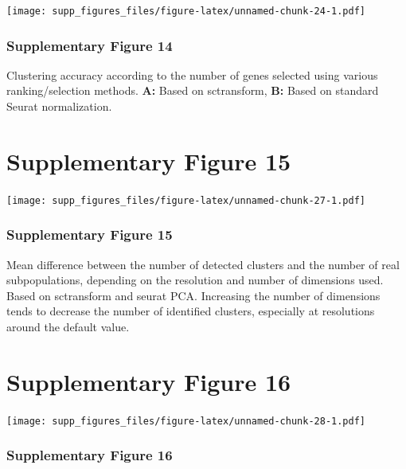 \documentclass[]{article}
\begin{document}
\texttt{[image: supp\_figures\_files/figure-latex/unnamed-chunk-24-1.pdf]}

\hypertarget{supplementary-figure-14-1}{%
\subsubsection{Supplementary Figure
14}\label{supplementary-figure-14-1}}

Clustering accuracy according to the number of genes selected using
various ranking/selection methods. \textbf{A:} Based on sctransform,
\textbf{B:} Based on standard Seurat normalization.

\newpage

\hypertarget{supplementary-figure-15}{%
\section{Supplementary Figure 15}\label{supplementary-figure-15}}

\texttt{[image: supp\_figures\_files/figure-latex/unnamed-chunk-27-1.pdf]}

\hypertarget{supplementary-figure-15-1}{%
\subsubsection{Supplementary Figure
15}\label{supplementary-figure-15-1}}

Mean difference between the number of detected clusters and the number
of real subpopulations, depending on the resolution and number of
dimensions used. Based on sctransform and seurat PCA. Increasing the
number of dimensions tends to decrease the number of identified
clusters, especially at resolutions around the default value.

\newpage

\hypertarget{supplementary-figure-16}{%
\section{Supplementary Figure 16}\label{supplementary-figure-16}}

\texttt{[image: supp\_figures\_files/figure-latex/unnamed-chunk-28-1.pdf]}

\hypertarget{supplementary-figure-16-1}{%
\subsubsection{Supplementary Figure
16}\label{supplementary-figure-16-1}}
\end{document}
